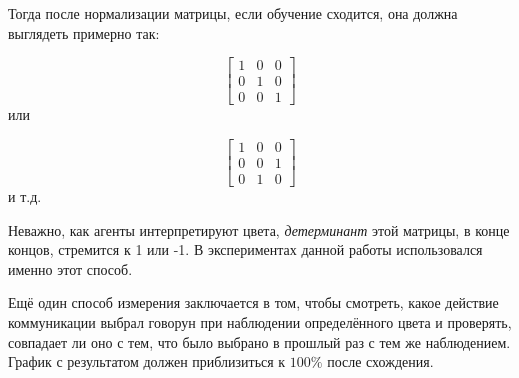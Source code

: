 Тогда после нормализации матрицы, если обучение сходится, она должна выглядеть примерно так:

\begin{equation*}
    \begin{bmatrix}
        1 & 0 & 0 \\
        0 & 1 & 0 \\
        0 & 0 & 1
    \end{bmatrix}
\end{equation*} или

\begin{equation*}
    \begin{bmatrix}
        1 & 0 & 0 \\
        0 & 0 & 1 \\
        0 & 1 & 0
    \end{bmatrix}
\end{equation*} и т.д.

Неважно, как агенты интерпретируют цвета, \textit{детерминант} этой матрицы, в конце концов, стремится к 1 или -1. В экспериментах данной работы использовался именно этот способ.

Ещё один способ измерения заключается в том, чтобы смотреть, какое действие коммуникации выбрал говорун при наблюдении определённого цвета и проверять, совпадает ли оно с тем, что было выбрано в прошлый раз с тем же наблюдением. График с результатом должен приблизиться к $100\%$ после схождения.


